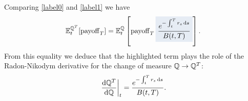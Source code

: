 Comparing \eqref{label0} and \eqref{label1} we have 
\begin{equation}
    \mathbb{E}_t^{\Qmeas^T}[\pay_T] = \mathbb{E}_t^{\Qmeas}\left[\pay_T \hlc{mylightblue}{\frac{e^{-\int_t^T r_s\,\dd s}}{B(t,T)}}\right].
\end{equation}
From this equality we deduce that the highlighted term plays the role of the Radon-Nikodym derivative for the change of measure $\mathbb{Q}\to\mathbb{Q}^T$:
\begin{equation}
    \eval{\frac{\dd \Qmeas^T}{\dd \Qmeas}}_t = \frac{e^{-\int_t^T r_s\,\dd s}}{B(t,T)}.
\end{equation}
